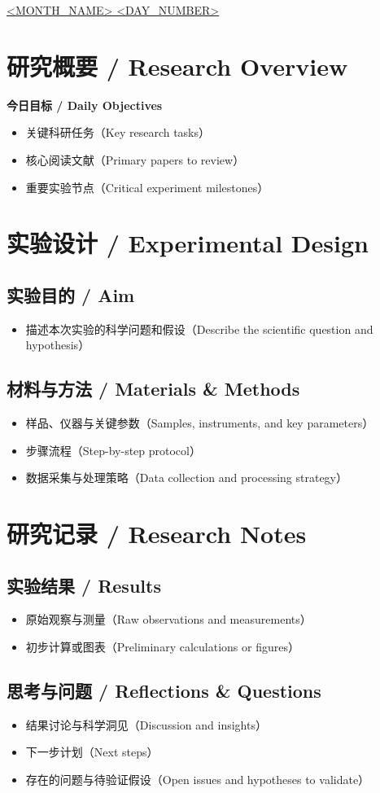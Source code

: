 \documentclass[11pt,letterpaper]{article}
\begin{document}
\href{run:<FILENAME>}{\Huge <MONTH_NAME> <DAY_NUMBER>}

\section*{研究概要 / Research Overview}
\textbf{今日目标 / Daily Objectives}
\begin{itemize}
    \item 关键科研任务（Key research tasks）
    \item 核心阅读文献（Primary papers to review）
    \item 重要实验节点（Critical experiment milestones）
\end{itemize}

\section{实验设计 / Experimental Design}
\subsection*{实验目的 / Aim}
\begin{itemize}
    \item 描述本次实验的科学问题和假设（Describe the scientific question and hypothesis）
\end{itemize}

\subsection*{材料与方法 / Materials \& Methods}
\begin{itemize}
    \item 样品、仪器与关键参数（Samples, instruments, and key parameters）
    \item 步骤流程（Step-by-step protocol）
    \item 数据采集与处理策略（Data collection and processing strategy）
\end{itemize}

\section{研究记录 / Research Notes}
\subsection*{实验结果 / Results}
\begin{itemize}
    \item 原始观察与测量（Raw observations and measurements）
    \item 初步计算或图表（Preliminary calculations or figures）
\end{itemize}

\subsection*{思考与问题 / Reflections \& Questions}
\begin{itemize}
    \item 结果讨论与科学洞见（Discussion and insights）
    \item 下一步计划（Next steps）
    \item 存在的问题与待验证假设（Open issues and hypotheses to validate）
\end{itemize}



\end{document}
